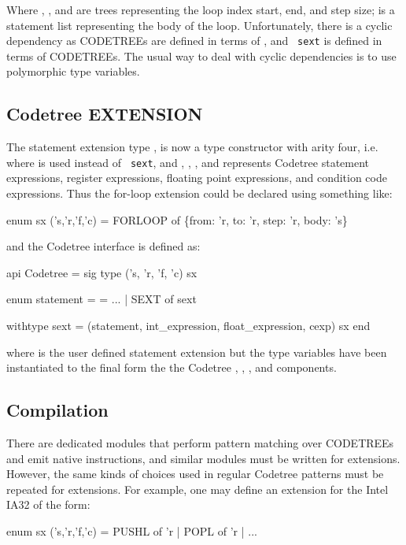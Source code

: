 Where , , and  are  trees representing
the loop index start, end, and step size;   is a statement list
representing the body of the loop. Unfortunately, there is a cyclic
dependency as CODETREEs are defined in terms of , and {\tt
sext} is defined in terms of CODETREEs. The usual way to deal with 
cyclic dependencies is to use polymorphic type variables. 

\subsection{Codetree EXTENSION}

The statement extension type , is now a type constructor
with arity four, i.e. 
 where  is used instead of {\tt
sext}, and , , , and  represents
Codetree statement expressions, register expressions, floating point
expressions, and condition code expressions. Thus the for-loop
extension could be declared using something like:
\begin{SML}
  enum sx ('s,'r,'f,'c) 
    = FORLOOP of \{from: 'r, to: 'r, step: 'r, body: 's\}
\end{SML}
and the Codetree interface is defined as:
\begin{SML}
  api Codetree = sig
    type ('s, 'r, 'f, 'c) sx

    enum statement =
      = ...
      | SEXT of sext

   withtype sext = (statement, int_expression, float_expression, cexp) sx
  end
\end{SML}

where  is the user defined statement extension but the
type variables have been instantiated to the final form the the Codetree 
, , , and  components. 

\subsection{Compilation}

There are dedicated modules that perform pattern matching over CODETREEs 
and emit native instructions, and similar modules must be written for
extensions.  However, the same kinds of choices used in regular Codetree 
patterns must be repeated for extensions. For example, one may define
an extension for the Intel IA32 of the form:

\begin{SML}
  enum sx ('s,'r,'f,'c) = PUSHL of 'r | POPL of 'r | ...
\end{SML}

